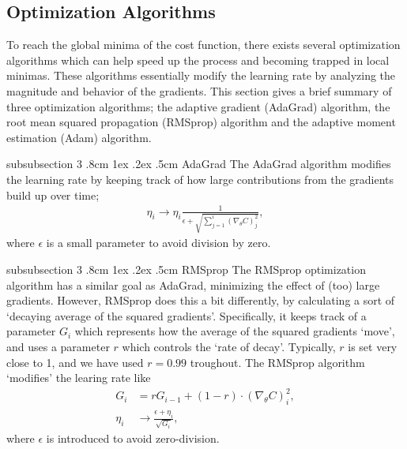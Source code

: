 \documentclass[%
reprint,s
amsmath,amssymb,
aps,
]{revtex4-2}
\makeatletter
\renewcommand{\subsubsection}{%
	\@startsection
	{subsubsection}%
	{3}%
	{\z@}%
	{.8cm \@plus1ex \@minus .2ex}%
	{.5cm}%
	{\normalfont\small\centering}%
}
\makeatother
\begin{document}
\subsection{Optimization Algorithms} \label{sec:optimization_algorithms}
To reach the global minima of the cost function, there exists several optimization algorithms which can help speed up the process and becoming trapped in local minimas. These algorithms essentially modify the learning rate by analyzing the magnitude and behavior of the gradients. This section gives a brief summary of three optimization algorithms; the adaptive gradient (AdaGrad) algorithm, the root mean squared propagation (RMSprop) algorithm and the adaptive moment estimation (Adam) algorithm. 


\subsubsection{AdaGrad}
The AdaGrad algorithm modifies the learning rate by keeping track of how large contributions from the gradients build up over time;
\begin{align}
	\eta_i \rightarrow \eta_i \frac{1}{\epsilon + \sqrt{\sum_{j=1}^{i}(\nabla_{\theta}C)_{j}^{2}}},
\end{align}
where \(\epsilon\) is a small parameter to avoid division by zero.

\subsubsection{RMSprop}
The RMSprop optimization algorithm has a similar goal as AdaGrad, minimizing the effect of (too) large gradients. However, RMSprop does this a bit differently, by calculating a sort of `decaying average of the squared gradients'. Specifically, it keeps track of a parameter \(G_i\) which represents how the average of the squared gradients `move', and uses a parameter \( r \) which controls the `rate of decay'. Typically, \( r\) is set very close to 1, and we have used \(r=0.99\) troughout. The RMSprop algorithm `modifies' the learing rate like 
\begin{align}
	G_i &= r G_{i-1} + (1 - r) \cdot (\nabla_{\theta}C)_{i}^{2}, \\
	\eta_i &\rightarrow \frac{\epsilon + \eta_i}{\sqrt{G_i}},
\end{align}
where \(\epsilon\) is introduced to avoid zero-division.
\end{document}
